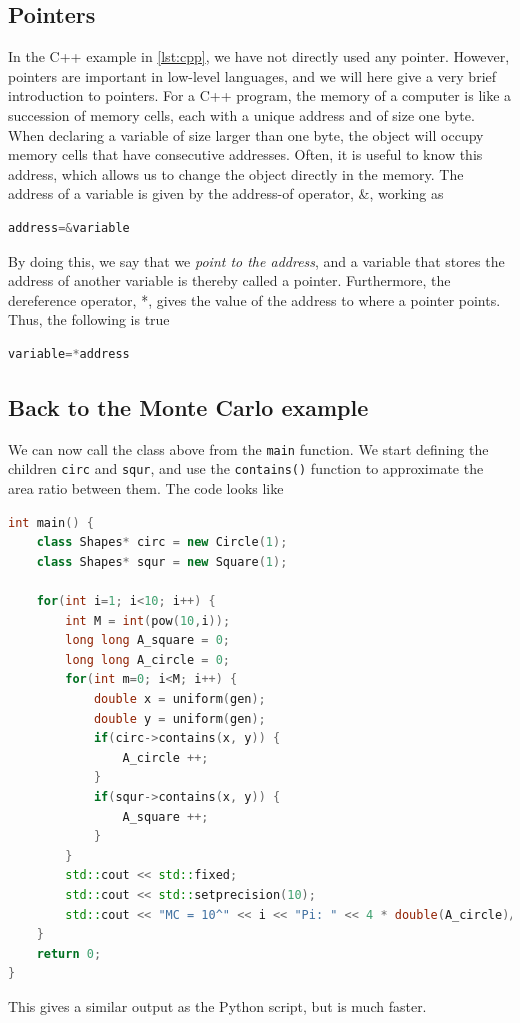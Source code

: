 \subsection{Pointers}
In the C++ example in \eqref{lst:cpp}, we have not directly used any pointer. However, pointers are important in low-level languages, and we will here give a very brief introduction to pointers. For a C++ program, the memory of a computer is like a succession of memory cells, each with a unique address and of size one byte. When declaring a variable of size larger than one byte, the object will occupy memory cells that have consecutive addresses. Often, it is useful to know this address, which allows us to change the object directly in the memory. The address of a variable is given by the address-of operator, \&, working as
\lstset{basicstyle=\scriptsize}
\begin{lstlisting}[language=C++]
address=&variable
\end{lstlisting}
By doing this, we say that we \textit{point to the address}, and a variable that stores the address of another variable is thereby called a pointer. Furthermore, the dereference operator, *, gives the value of the address to where a pointer points. Thus, the following is true
\begin{lstlisting}[language=C++]
variable=*address
\end{lstlisting}

\subsection{Back to the Monte Carlo example}
We can now call the class above from the \texttt{main} function. We start defining the children \texttt{circ} and \texttt{squr}, and use the \texttt{contains()} function to approximate the area ratio between them. The code looks like 
\begin{lstlisting}[language=c++]
int main() {   
	class Shapes* circ = new Circle(1);
	class Shapes* squr = new Square(1);

	for(int i=1; i<10; i++) {
		int M = int(pow(10,i));
		long long A_square = 0;
		long long A_circle = 0;
		for(int m=0; i<M; i++) {
			double x = uniform(gen);
			double y = uniform(gen);
			if(circ->contains(x, y)) {
				A_circle ++;
			}
			if(squr->contains(x, y)) {
				A_square ++;
			}
		}
		std::cout << std::fixed;
		std::cout << std::setprecision(10);
		std::cout << "MC = 10^" << i << "Pi: " << 4 * double(A_circle)/A_square << std::endl;
	}
	return 0;
}
\end{lstlisting}
This gives a similar output as the Python script, but is much faster.

